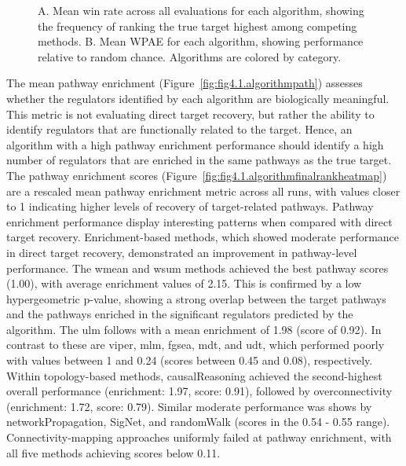 
\begin{figure}[htbp]
  \centering
  \caption[Mean win rate and WPAE across all evaluations for each algorithm.]{A. Mean win rate across all evaluations for each algorithm, showing the frequency of ranking the true target highest among competing methods. B. Mean \gls{WPAE} for each algorithm, showing performance relative to random chance. Algorithms are colored by category.}
  \label{fig:fig4.3.WinandWPAE}
\end{figure}

The mean pathway enrichment (Figure~\ref{fig:fig4.1.algorithmpath}) assesses whether the regulators identified by each algorithm are biologically meaningful.
This metric is not evaluating direct target recovery, but rather the ability to identify regulators that are functionally related to the target.
Hence, an algorithm with a high pathway enrichment performance should identify a high number of regulators that are enriched in the same pathways as the true target.
The pathway enrichment scores (Figure~\ref{fig:fig4.1.algorithmfinalrankheatmap}) are a rescaled mean pathway enrichment metric across all runs, with values closer to 1 indicating higher levels of recovery of target-related pathways.
Pathway enrichment performance display interesting patterns when compared with direct target recovery.
Enrichment-based methods, which showed moderate performance in direct target recovery, demonstrated an improvement in pathway-level performance.
The wmean and wsum methods achieved the best pathway scores (1.00), with average enrichment values of 2.15. This is confirmed by a low hypergeometric p-value, showing a strong overlap between the target pathways and the pathways enriched in the significant regulators predicted by the algorithm.
The ulm follows with a mean enrichment of 1.98 (score of 0.92).
In contrast to these are viper, mlm, fgsea, mdt, and udt, which performed poorly with values between 1 and 0.24 (scores between 0.45 and 0.08), respectively.
Within topology-based methods, causalReasoning achieved the second-highest overall performance (enrichment: 1.97, score: 0.91), followed by overconnectivity (enrichment: 1.72, score: 0.79).
Similar moderate performance was shows by networkPropagation, SigNet, and randomWalk (scores in the 0.54 - 0.55 range).
Connectivity-mapping approaches uniformly failed at pathway enrichment, with all five methods achieving scores below 0.11.

